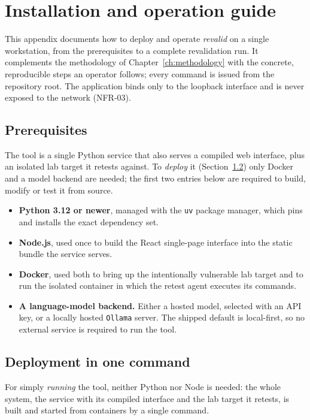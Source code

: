 \chapter{Installation and operation guide}
\label{ch:annex-install}

This appendix documents how to deploy and operate \emph{revalid} on a single
workstation, from the prerequisites to a complete revalidation run. It complements
the methodology of Chapter~\ref{ch:methodology} with the concrete, reproducible
steps an operator follows; every command is issued from the repository root. The
application binds only to the loopback interface and is never exposed to the network
(NFR-03).

\section{Prerequisites}
\label{sec:annex-prereq}

The tool is a single Python service that also serves a compiled web interface, plus
an isolated lab target it retests against. To \emph{deploy} it
(Section~\ref{sec:annex-deploy}) only Docker and a model backend are needed; the
first two entries below are required to build, modify or test it from source.

\begin{itemize}
\item \textbf{Python 3.12 or newer}, managed with the \texttt{uv} package manager,
  which pins and installs the exact dependency set.
\item \textbf{Node.js}, used once to build the React single-page interface into the
  static bundle the service serves.
\item \textbf{Docker}, used both to bring up the intentionally vulnerable lab target
  and to run the isolated container in which the retest agent executes its commands.
\item \textbf{A language-model backend.} Either a hosted model, selected with an API
  key, or a locally hosted \texttt{Ollama} server. The shipped default is
  local-first, so no external service is required to run the tool.
\end{itemize}

\section{Deployment in one command}
\label{sec:annex-deploy}

For simply \emph{running} the tool, neither Python nor Node is needed: the whole
system, the service with its compiled interface and the lab target it retests,
is built and started from containers by a single command.

